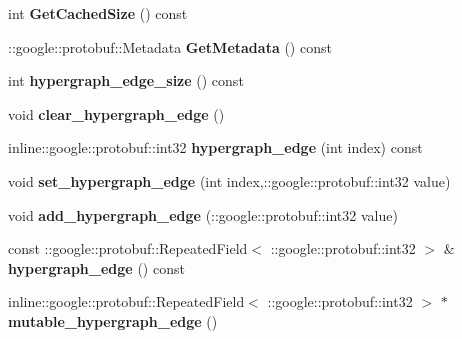 \begin{DoxyCompactItemize}
\item 
\hypertarget{classlattice_1_1Origin_a1b84d6bcbe33ca6aa15fc0659fe1ce6c}{
int {\bfseries GetCachedSize} () const }
\label{classlattice_1_1Origin_a1b84d6bcbe33ca6aa15fc0659fe1ce6c}

\item 
\hypertarget{classlattice_1_1Origin_a33eb9a687e88d1a845a2420c29757ee7}{
::google::protobuf::Metadata {\bfseries GetMetadata} () const }
\label{classlattice_1_1Origin_a33eb9a687e88d1a845a2420c29757ee7}

\item 
\hypertarget{classlattice_1_1Origin_a5a7105c401b9faf2975a62ad0f6e5f9c}{
int {\bfseries hypergraph\_\-edge\_\-size} () const }
\label{classlattice_1_1Origin_a5a7105c401b9faf2975a62ad0f6e5f9c}

\item 
\hypertarget{classlattice_1_1Origin_a16018cbe1e1bda37da1faeda9c113654}{
void {\bfseries clear\_\-hypergraph\_\-edge} ()}
\label{classlattice_1_1Origin_a16018cbe1e1bda37da1faeda9c113654}

\item 
\hypertarget{classlattice_1_1Origin_a5a0033d07d792ad0da3388746bc50dd0}{
inline::google::protobuf::int32 {\bfseries hypergraph\_\-edge} (int index) const }
\label{classlattice_1_1Origin_a5a0033d07d792ad0da3388746bc50dd0}

\item 
\hypertarget{classlattice_1_1Origin_a4ae3e1c5181c4224f9569c7ef916aa94}{
void {\bfseries set\_\-hypergraph\_\-edge} (int index,::google::protobuf::int32 value)}
\label{classlattice_1_1Origin_a4ae3e1c5181c4224f9569c7ef916aa94}

\item 
\hypertarget{classlattice_1_1Origin_adb776f18649e3baa7df68d53dc79bbd6}{
void {\bfseries add\_\-hypergraph\_\-edge} (::google::protobuf::int32 value)}
\label{classlattice_1_1Origin_adb776f18649e3baa7df68d53dc79bbd6}

\item 
\hypertarget{classlattice_1_1Origin_a86672ab29cc9b2b85da694917dd38f2a}{
const ::google::protobuf::RepeatedField$<$ ::google::protobuf::int32 $>$ \& {\bfseries hypergraph\_\-edge} () const }
\label{classlattice_1_1Origin_a86672ab29cc9b2b85da694917dd38f2a}

\item 
\hypertarget{classlattice_1_1Origin_ab9fd75828ae2c7b5188beba8e7d511a5}{
inline::google::protobuf::RepeatedField$<$ ::google::protobuf::int32 $>$ $\ast$ {\bfseries mutable\_\-hypergraph\_\-edge} ()}
\label{classlattice_1_1Origin_ab9fd75828ae2c7b5188beba8e7d511a5}


\end{DoxyCompactItemize}
